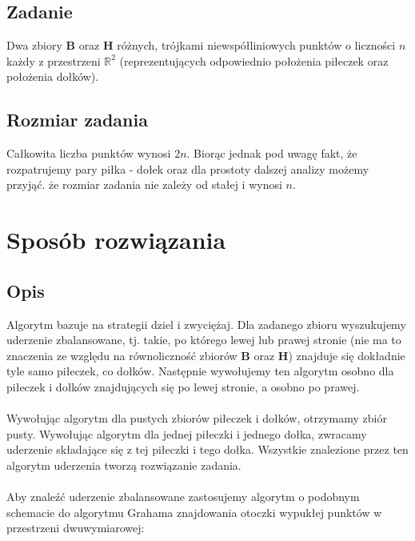 \documentclass[10pt,a4paper]{article}
\begin{document}
	\subsection{Zadanie}
	Dwa zbiory $\mathbf{B}$ oraz $\mathbf{H}$ różnych, trójkami niewspółliniowych punktów o liczności $n$ każdy z przestrzeni $\mathbb{R}^{2}$ (reprezentujących odpowiednio położenia piłeczek oraz położenia dołków).
	
	\subsection{Rozmiar zadania}
	
	Całkowita liczba punktów wynosi $2n$. Biorąc jednak pod uwagę fakt, że rozpatrujemy pary piłka - dołek oraz dla prostoty dalszej analizy możemy przyjąć. że rozmiar zadania nie zależy od stałej i wynosi $n$.
	
	\section{Sposób rozwiązania}
	
	\subsection{Opis}
	
	Algorytm bazuje na strategii dziel i zwyciężaj. Dla zadanego zbioru wyszukujemy uderzenie zbalansowane, tj. takie, po którego lewej lub prawej stronie (nie ma to znaczenia ze względu na równoliczność zbiorów $\mathbf{B}$ oraz $\mathbf{H}$) znajduje się dokładnie tyle samo piłeczek, co dołków. Następnie wywołujemy ten algorytm osobno dla piłeczek i dołków znajdujących się po lewej stronie, a osobno po prawej. \\~\\
	Wywołując algorytm dla pustych zbiorów piłeczek i dołków, otrzymamy zbiór pusty. Wywołując algorytm dla jednej piłeczki i jednego dołka, zwracamy uderzenie składające się z tej piłeczki i tego dołka. Wszystkie znalezione przez ten algorytm uderzenia tworzą rozwiązanie zadania. \\~\\
	Aby znaleźć uderzenie zbalansowane zastosujemy algorytm o podobnym schemacie do algorytmu Grahama znajdowania otoczki wypukłej punktów w przestrzeni dwuwymiarowej:
	
\end{document}
